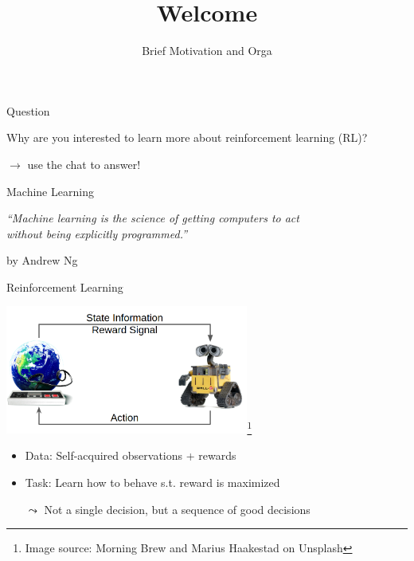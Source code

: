 


\title[ML-RL: Big Picture]{Welcome}
\subtitle{Brief Motivation and Orga}




	
	\maketitle

\begin{frame}[c]{Question}
	
	\centering
	{
	\huge
	Why are you interested to learn more about reinforcement learning (RL)?
	}

	\bigskip	\bigskip
	$\to$ use the chat to answer!
	
\end{frame}
\begin{frame}[c]{Machine Learning}

\centering
\textit{``Machine learning is the science of getting computers to act\\
 without being explicitly programmed.''}

\hfill by Andrew Ng

\end{frame}
\begin{frame}[c]{Reinforcement Learning}
	
	\centering
	\includegraphics[width=0.6\textwidth]{../w01_big_picture/images/rl_comic.png}\footnote{Image source: Morning Brew and Marius Haakestad on Unsplash}
	
	\bigskip
	
	\begin{itemize}
		\item Data: Self-acquired observations + rewards
		\item Task: Learn how to behave s.t. reward is maximized
		\item[$\leadsto$] Not a single decision, but a sequence of good decisions
	\end{itemize}	
	
	
\end{frame}

